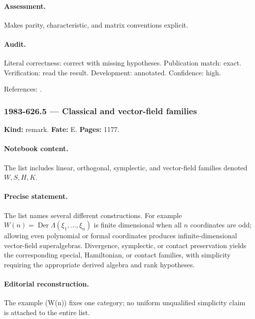 \paragraph{Assessment.} Makes parity, characteristic, and matrix conventions explicit.

\paragraph{Audit.} Literal correctness: correct with missing hypotheses. Publication match: exact. Verification: read the result. Development: annotated. Confidence: high.

\noindent References: \citep{leites1980introduction}.\par

\subsubsection{1983-626.5 --- Classical and vector-field families}

\label{item:1983-626.5}

\noindent\textbf{Kind:} remark. \textbf{Fate:} E. \textbf{Pages:} 1177.\par

\paragraph{Notebook content.} The list includes linear, orthogonal, symplectic, and vector-field families denoted \(W,S,H,K\).

\paragraph{Precise statement.} The list names several different constructions. For example \(W(n)=\operatorname{Der}\Lambda(\xi_1,\ldots,\xi_n)\) is finite dimensional when all \(n\) coordinates are odd; allowing even polynomial or formal coordinates produces infinite-dimensional vector-field superalgebras. Divergence, symplectic, or contact preservation yields the corresponding special, Hamiltonian, or contact families, with simplicity requiring the appropriate derived algebra and rank hypotheses.

\paragraph{Editorial reconstruction.} The example (W(n)) fixes one category; no uniform unqualified simplicity claim is attached to the entire list.

